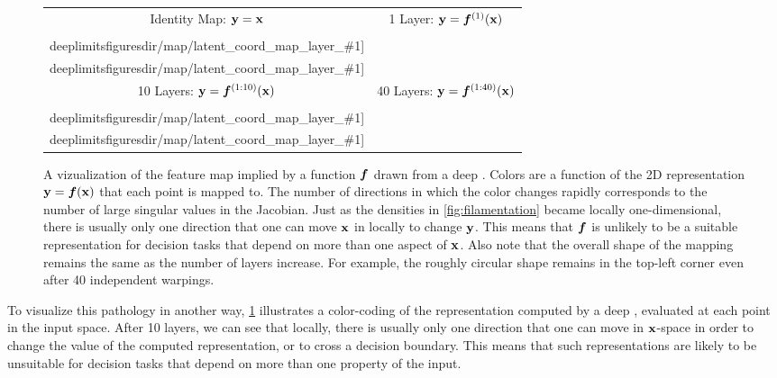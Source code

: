\newcommand{\mappic}[1]{ \texttt{[image: \\deeplimitsfiguresdir/map/latent\_coord\_map\_layer\_\#1]} } 
\newcommand{\mappiccon}[1]{ \texttt{[image: \\deeplimitsfiguresdir/map\_connected/latent\_coord\_map\_layer\_\#1]} }
\begin{figure}
\centering
\begin{tabular}{cc}
\hspace{-0.15in} Identity Map: ${\bf{y}} = {\bf{x}}$ &
\hspace{-0.15in} 1 Layer: ${\bf{y}} = \boldsymbol{f}^{(1)}({\bf{x}})$ \\
\hspace{-0.15in} \mappic{0} & \mappic{1} \\
\hspace{-0.15in} 10 Layers: ${\bf{y}} = \boldsymbol{f}^{(1:10)}({\bf{x}})$ &
\hspace{-0.15in} 40 Layers: ${\bf{y}} = \boldsymbol{f}^{(1:40)}({\bf{x}})$ \\
\hspace{-0.15in} \mappic{10} & \mappic{40}
\end{tabular}
\caption[Visualization of a feature map drawn from a deep \sgp{}]
{A vizualization of the feature map implied by a function $\boldsymbol{f}$ drawn from a deep \gp{}.
Colors are a function of the 2D representation ${\bf{y}} = \boldsymbol{f}({\bf{x}})$ that each point is mapped to. %
The number of directions in which the color changes rapidly corresponds to the number of large singular values in the Jacobian.
Just as the densities in \cref{fig:filamentation} became locally one-dimensional, there is usually only one direction that one can move ${\bf{x}}$ in locally to change ${\bf{y}}$.
This means that $\boldsymbol{f}$ is unlikely to be a suitable representation for decision tasks that depend on more than one aspect of ${\bf{x}}$.  Also note that the overall shape of the mapping remains the same as the number of layers increase.
For example, the roughly circular shape remains in the top-left corner even after 40 independent warpings.}
\label{fig:deep_map}
\end{figure}
%
To visualize this pathology in another way, \cref{fig:deep_map} illustrates a color-coding of the representation computed by a deep \gp{}, evaluated at each point in the input space.
After 10 layers, we can see that locally, there is usually only one direction that one can move in ${\bf{x}}$-space in order to change the value of the computed representation, or to cross a decision boundary.
This means that such representations are likely to be unsuitable for decision tasks that depend on more than one property of the input.

